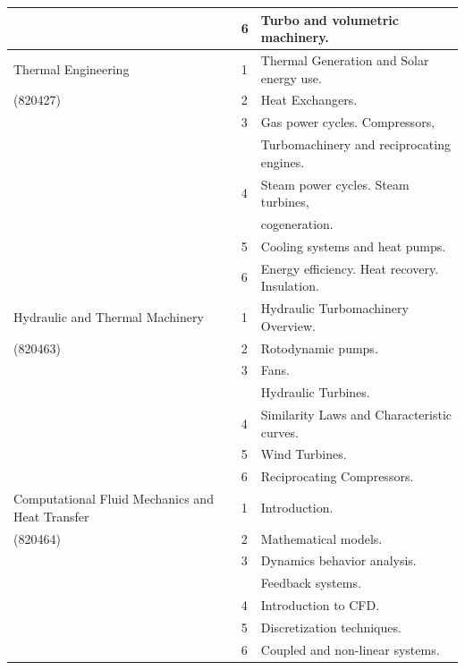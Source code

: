 \documentclass{article}
\begin{document}
\begin{tabular}{l l l }
$\ $                & 6             &  Turbo and volumetric machinery.                     \\
\hline
 Thermal Engineering  & 1           &  Thermal Generation and Solar energy use.            \\ 
(820427)              & 2           &  Heat Exchangers.                                    \\
$\ $                  & 3           &  Gas power cycles. Compressors,                      \\
$\ $                  &   $\ $      &  Turbomachinery and reciprocating engines.           \\
$\ $                  & 4           &  Steam power cycles. Steam turbines,                 \\
$\ $                  &   $\ $      &  cogeneration.                                       \\
$\ $                  & 5           &  Cooling systems and heat pumps.                     \\  
$\ $                  & 6           &  Energy efficiency. Heat recovery. Insulation.       \\ 
\hline
Hydraulic and Thermal Machinery & 1 &  Hydraulic Turbomachinery Overview.                  \\ 
(820463)              & 2           &  Rotodynamic pumps.                                  \\
$\ $                  & 3           &  Fans.                                               \\
$\ $                  &   $\ $      &  Hydraulic Turbines.                                 \\
$\ $                  & 4           &  Similarity Laws and Characteristic curves.          \\
$\ $                  & 5           &  Wind Turbines.                                      \\ 
$\ $                  & 6           &  Reciprocating Compressors.                          \\
\hline
Computational Fluid Mechanics and Heat Transfer & 1 &  Introduction.  \\ 
(820464)              & 2           &  Mathematical models.                                \\
$\ $                  & 3           &  Dynamics behavior analysis.                         \\
$\ $                  &   $\ $      &  Feedback systems.                                   \\
$\ $                  & 4           &  Introduction to CFD.                                \\
$\ $                  & 5           &  Discretization techniques.                          \\ 
$\ $                  & 6           &  Coupled and non-linear systems.                     \\
\hline
\end{tabular}
\end{document}
